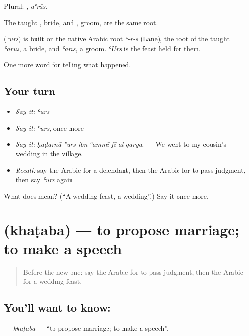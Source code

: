 Plural: , \emph{aʿrās}.

The taught , bride, and , groom, are the same root.

\begin{cousinweb}
\textbf{} (\emph{ʿurs}) is built on the native Arabic root \emph{ʿ-r-s} (Lane), the root of the taught \emph{ʿarūs}, a bride, and \emph{ʿarīs}, a groom. \emph{ʿUrs} is the feast held for them.
\end{cousinweb}

\begin{grammarlens}[title={What you've built}]
One more word for telling what happened.
\end{grammarlens}

\subsection*{Your turn}
\begin{itemize}
\raggedright
  \item \emph{Say it:} \emph{ʿurs}
  \item \emph{Say it:} \emph{ʿurs}, once more
  \item \emph{Say it:} \emph{ḥaḍarnā ʿurs ibn ʿammī fī al-qarya.} — We went to my cousin’s wedding in the village.
  \item \emph{Recall:} say the Arabic for a defendant, then the Arabic for to pass judgment, then say \emph{ʿurs} again
\end{itemize}

\begin{tcolorbox}[breakable,colback=teal!4,colframe=teal!35!black,title={Before you move on}]
What does  mean? (\textquotedblleft{}A wedding feast, a wedding\textquotedblright{}.) Say it once more.
\end{tcolorbox}
\section[\texorpdfstring{\ar{خطب} (khaṭaba)}{خطب (khaṭaba)}]{ (khaṭaba) — to propose marriage; to make a speech}

\label{lesson:AR-C306-khataba}



\begin{quote}
Before the new one: say the Arabic for to pass judgment, then the Arabic for a wedding feast.
\end{quote}

\subsection*{You'll want to know: }
\textbf{} — \emph{khaṭaba} — \textquotedblleft{}to propose marriage; to make a speech\textquotedblright{}.

